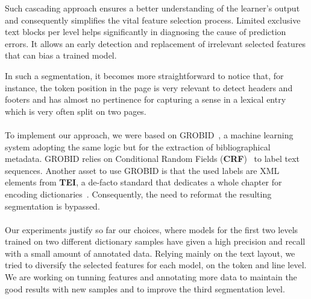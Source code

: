\documentclass[twocolumn,a4paper]{article}
\begin{document}
 Such cascading approach ensures a better understanding of the learner's output and consequently simplifies the vital feature selection process. Limited exclusive text blocks per level helps significantly in diagnosing the cause of prediction errors. It allows an early detection and replacement of irrelevant selected features that can bias a trained model. 
 
 In such a segmentation, it becomes more straightforward to notice that, for instance, the token position in the page is very relevant to detect headers and footers and has almost no pertinence for capturing a sense in a lexical entry which is very often split on two pages.  




\paragraph{}To implement our approach, we were based on GROBID~\cite{Lopez2015GROBIDI}, a machine learning system adopting the same logic but for the extraction of bibliographical metadata.  GROBID relies on Conditional Random Fields (\textbf{CRF})~\cite{lavergne2010practical} to label text sequences. Another asset to use GROBID is that the used labels are XML elements from \textbf{TEI}, a de-facto standard that dedicates a whole chapter for encoding dictionaries~\cite{budin2012creating}. Consequently, the need to reformat the resulting segmentation is bypassed.
 
\paragraph{}Our experiments justify so far our choices, where models for the first two levels trained on two different dictionary samples have given a high precision and recall with a small amount of annotated data. Relying mainly on the text layout, we tried to diversify the selected features for each model, on the token and line level. We are working on tunning features and annotating more data to maintain the good results with new samples and to improve the third segmentation level.  
\end{document}
